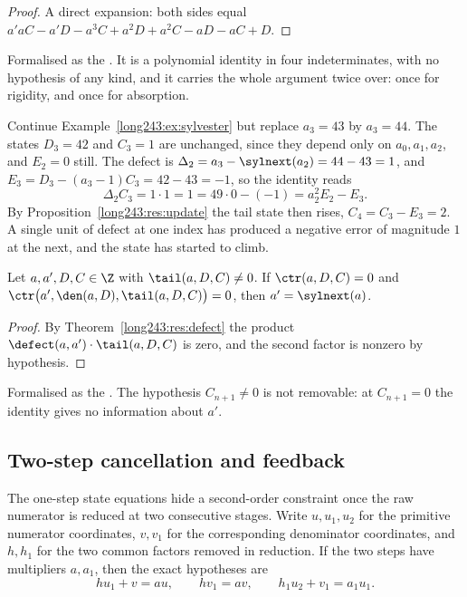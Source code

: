 \begin{proof}
A direct expansion: both sides equal
$a'aC-a'D-a^{3}C+a^{2}D+a^{2}C-aD-aC+D$.
\end{proof}

\noindent Formalised as the
.  It is a polynomial identity in four indeterminates, with no
hypothesis of any kind, and it carries the whole argument twice over: once for
rigidity, and once for absorption.

\begin{example}\label{long243:ex:defect}
Continue Example~\ref{long243:ex:sylvester} but replace $a_3=43$ by $a_3=44$.  The
states $D_3=42$ and $C_3=1$ are unchanged, since they depend only on
$a_0,a_1,a_2$, and $E_2=0$ still.  The defect is
$\Delta_2=a_3-\sylnext(a_2)=44-43=1$, and
$E_3=D_3-(a_3-1)C_3=42-43=-1$, so the identity reads
\[
 \Delta_2C_3=1\cdot1=1=49\cdot0-(-1)=a_2^{2}E_2-E_3 .
\]
By Proposition~\ref{long243:res:update} the tail state then rises, $C_4=C_3-E_3=2$.  A
single unit of defect at one index has produced a negative error of magnitude
$1$ at the next, and the state has started to climb.
\end{example}

\begin{theorem}\label{long243:res:step}
Let $a,a',D,C\in\Z$ with $\tail(a,D,C)\ne0$.  If
$\ctr(a,D,C)=0$ and $\ctr\bigl(a',\den(a,D),\tail(a,D,C)\bigr)=0$, then
$a'=\sylnext(a)$.
\end{theorem}

\begin{proof}
By Theorem~\ref{long243:res:defect} the product $\defect(a,a')\cdot\tail(a,D,C)$ is
zero, and the second factor is nonzero by hypothesis.
\end{proof}

\noindent Formalised as the
.  The hypothesis $C_{n+1}\ne0$ is not removable: at $C_{n+1}=0$
the identity gives no information about $a'$.

\subsection{Two-step cancellation and feedback}

The one-step state equations hide a second-order constraint once the raw
numerator is reduced at two consecutive stages.  Write $u,u_1,u_2$ for the
primitive numerator coordinates, $v,v_1$ for the corresponding denominator
coordinates, and $h,h_1$ for the two common factors removed in reduction.  If
the two steps have multipliers $a,a_1$, then the exact hypotheses are
\[
 hu_1+v=au,\qquad hv_1=av,\qquad
 h_1u_2+v_1=a_1u_1.
\]

